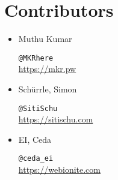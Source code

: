 \chapter*{Contributors}
\begin{itemize}
  \item Muthu Kumar\\
    \begin{footnotesize}
      \texttt{@MKRhere}\\
      \url{https://mkr.pw}
    \end{footnotesize}

  \item Schürrle, Simon\\
    \begin{footnotesize}
      \texttt{@SitiSchu}\\
      \url{https://sitischu.com}
    \end{footnotesize}

  \item EI, Ceda\\
    \begin{footnotesize}
      \texttt{@ceda\_ei}\\
      \url{https://webionite.com}
    \end{footnotesize}
\end{itemize}

